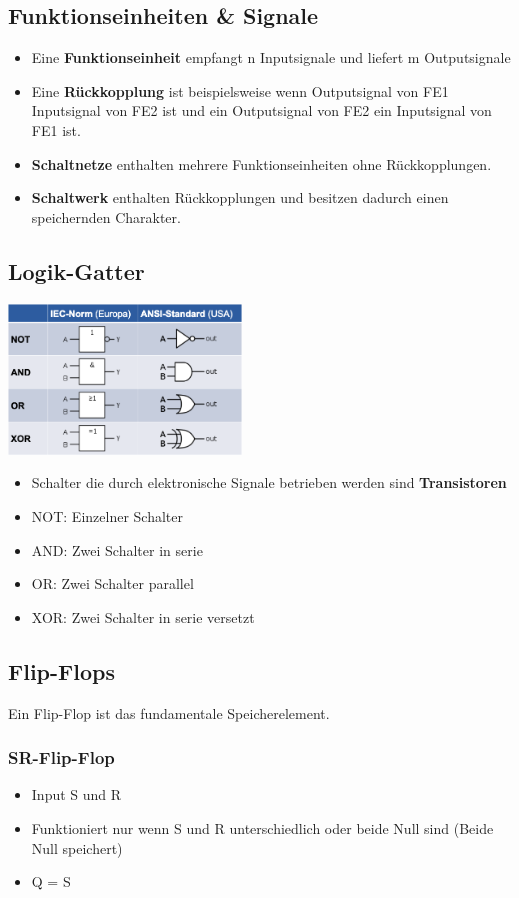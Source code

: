 \documentclass[6pt,a4paper]{scrartcl}
\begin{document}
\begin{multicols*}{4}
			\subsection{Funktionseinheiten \& Signale}
				\begin{itemize}\itemsep0pt
					\item Eine \textbf{Funktionseinheit} empfangt n Inputsignale und liefert m Outputsignale
					\item Eine \textbf{Rückkopplung} ist beispielsweise wenn Outputsignal von FE1 Inputsignal von FE2 ist und ein Outputsignal von FE2 ein Inputsignal von FE1 ist.
					\item \textbf{Schaltnetze} enthalten mehrere Funktionseinheiten ohne Rückkopplungen.
					\item \textbf{Schaltwerk} enthalten Rückkopplungen und besitzen dadurch einen speichernden Charakter.
				\end{itemize}
			\subsection{Logik-Gatter}
				\includegraphics[height=4cm]{img/digitaleGrundbausteine.png} 
				\begin{itemize}\itemsep0pt
					\item Schalter die durch elektronische Signale betrieben werden sind \textbf{Transistoren}
					\item NOT: Einzelner Schalter
					\item AND: Zwei Schalter in serie
					\item OR: Zwei Schalter parallel
					\item XOR: Zwei Schalter in serie versetzt
				\end{itemize}
			
			\subsection{Flip-Flops}
			Ein Flip-Flop ist das fundamentale Speicherelement.
				\subsubsection{SR-Flip-Flop}
					\begin{itemize}\itemsep0pt
						\item Input S und R
						\item Funktioniert nur wenn S und R unterschiedlich oder beide Null sind (Beide Null speichert)
						\item Q = S
					\end{itemize}
					

\end{multicols*}
\end{document}
